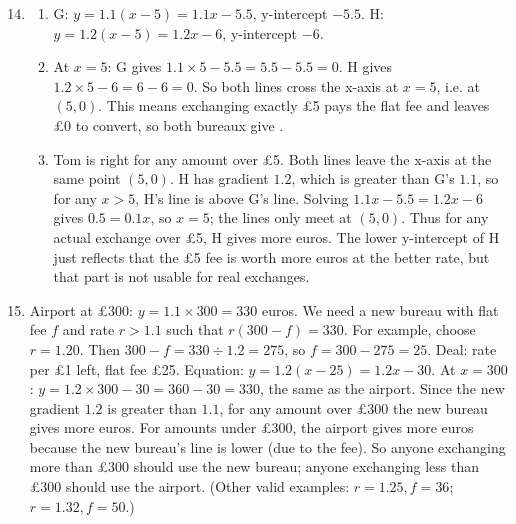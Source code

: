 \documentclass[12pt,a4paper]{article}
\begin{document}
\begin{enumerate}[label=\textbf{Q\arabic*.}, leftmargin=*]
\setcounter{enumi}{13}
\item
\begin{enumerate}
\item G: \(y=1.1(x-5)=1.1x-5.5\), y-intercept \(-5.5\). H: \(y=1.2(x-5)=1.2x-6\), y-intercept \(-6\).
\item At \(x=5\): G gives \(1.1\times5-5.5=5.5-5.5=0\). H gives \(1.2\times5-6=6-6=0\). So both lines cross the x-axis at \(x=5\), i.e. at \((5,0)\). This means exchanging exactly \pounds5 pays the flat fee and leaves \pounds0 to convert, so both bureaux give .
\item Tom is right for any amount over \pounds5. Both lines leave the x-axis at the same point \((5,0)\). H has gradient \(1.2\), which is greater than G's \(1.1\), so for any \(x>5\), H's line is above G's line. Solving \(1.1x-5.5=1.2x-6\) gives \(0.5=0.1x\), so \(x=5\); the lines only meet at \((5,0)\). Thus for any actual exchange over \pounds5, H gives more euros. The lower y-intercept of H just reflects that the \pounds5 fee is worth more euros at the better rate, but that part is not usable for real exchanges.
\end{enumerate}

\item
Airport at \pounds300: \(y=1.1\times300=330\) euros.
We need a new bureau with flat fee \(f\) and rate \(r>1.1\) such that \(r(300-f)=330\).
For example, choose \(r=1.20\). Then \(300-f=330\div1.2=275\), so \(f=300-275=25\). Deal: rate  per \pounds1 left, flat fee \pounds25.
Equation: \(y=1.2(x-25)=1.2x-30\).
At \(x=300\): \(y=1.2\times300-30=360-30=330\), the same as the airport.
Since the new gradient \(1.2\) is greater than \(1.1\), for any amount over \pounds300 the new bureau gives more euros. For amounts under \pounds300, the airport gives more euros because the new bureau's line is lower (due to the fee). So anyone exchanging more than \pounds300 should use the new bureau; anyone exchanging less than \pounds300 should use the airport.
(Other valid examples: \(r=1.25, f=36\); \(r=1.32, f=50\).)


\end{enumerate}
\end{document}
